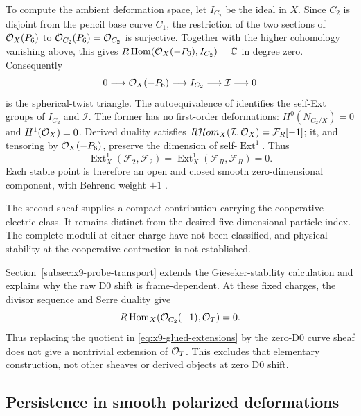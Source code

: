 To compute the ambient deformation space, let $I_{C_2}$ be the ideal
in $X$. Since $C_2$ is disjoint from the pencil base curve $C_1$,
the restriction of the two sections of $\mathcal O_X(P_6)$ to
$\mathcal O_{C_2}(P_6)=\mathcal O_{C_2}$ is surjective. Together with the higher
cohomology vanishing above, this gives
$R\operatorname{Hom}(\mathcal O_X(-P_6),I_{C_2})=\mathbb C$ in degree zero.
Consequently
\begin{equation}
 0\longrightarrow\mathcal O_X(-P_6)\longrightarrow I_{C_2}
       \longrightarrow\mathcal I\longrightarrow0
 \label{eq:x9-glued-twist}
\end{equation}
is the spherical-twist triangle. The autoequivalence of
\cite[Theorem~1.2]{Seidel:2001Twists} identifies the self-Ext groups
of $I_{C_2}$ and $\mathcal I$. The former has no first-order
deformations: $H^0(N_{C_2/X})=0$ and $H^1(\mathcal O_X)=0$.
Derived duality satisfies
$R\mathcal Hom_X(\mathcal I,\mathcal O_X)=\mathcal F_R[-1]$;
it, and tensoring by $\mathcal O_X(-P_6)$, preserve the dimension of
self-$\operatorname{Ext}^1$. Thus
\begin{equation}
 \operatorname{Ext}^1_X(\mathcal F_2,\mathcal F_2)
 =\operatorname{Ext}^1_X(\mathcal F_R,\mathcal F_R)=0.
 \label{eq:x9-glued-rigidity}
\end{equation}
Each stable point is therefore an open and closed smooth
zero-dimensional component, with Behrend weight $+1$
\cite[Section~1.2 and Theorem~4.18]{Behrend:2009DT}.

The second sheaf supplies a compact contribution carrying the
cooperative electric class. It remains distinct from the desired five-dimensional particle
index. The complete moduli at either charge have not been classified,
and physical stability at the cooperative contraction is not established.

Section~\ref{subsec:x9-probe-transport} extends the Gieseker-stability
calculation and explains why the raw D0 shift is frame-dependent.
At these fixed charges, the divisor
sequence and Serre duality give
\[
 R\operatorname{Hom}_X(\mathcal O_{C_2}(-1),\mathcal O_T)=0.
\]
Thus replacing the quotient in
\eqref{eq:x9-glued-extensions} by the zero-D0 curve sheaf does not
give a nontrivial extension of $\mathcal O_T$. This excludes that elementary
construction, not other sheaves or derived objects at zero D0 shift.

\subsection{Persistence in smooth polarized deformations}
\label{subsec:probe-smooth-deformations}

